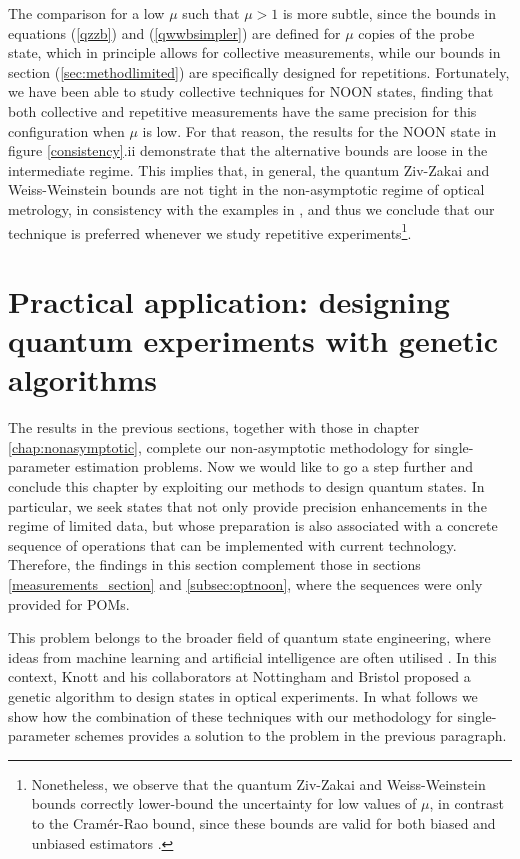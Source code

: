 The comparison for a low $\mu$ such that $\mu > 1$ is more subtle, since the bounds in equations (\ref{qzzb}) and (\ref{qwwbsimpler}) are defined for $\mu$ copies of the probe state, which in principle allows for collective measurements, while our bounds in section (\ref{sec:methodlimited}) are specifically designed for repetitions. Fortunately, we have been able to study collective techniques for NOON states, finding that both collective and repetitive measurements have the same precision for this configuration when $\mu$ is low. For that reason, the results for the NOON state in figure \ref{consistency}.ii demonstrate that the alternative bounds are loose in the intermediate regime. This implies that, in general, the quantum Ziv-Zakai and Weiss-Weinstein bounds are not tight in the non-asymptotic regime of optical metrology, in consistency with the examples in \cite{tsang2016}, and thus we conclude that our technique is preferred whenever we study repetitive experiments\footnote{Nonetheless, we observe that the quantum Ziv-Zakai and Weiss-Weinstein bounds correctly lower-bound the uncertainty for low values of $\mu$, in contrast to the Cram\'{e}r-Rao bound, since these bounds are valid for both biased and unbiased estimators \cite{tsang2012, tsang2016,  bayesbounds2007}.}. 

\section{Practical application: designing quantum experiments with genetic algorithms}
\label{sec:genetic}

The results in the previous sections, together with those in chapter \ref{chap:nonasymptotic}, complete our non-asymptotic methodology for single-parameter estimation problems. Now we would like to go a step further and conclude this chapter by exploiting our methods to design quantum states. In particular, we seek states that not only provide precision enhancements in the regime of limited data, but whose preparation is also associated with a concrete sequence of operations that can be implemented with current technology. Therefore, the findings in this section complement those in sections \ref{measurements_section} and \ref{subsec:optnoon}, where the sequences were only provided for POMs.

This problem belongs to the broader field of quantum state engineering, where ideas from machine learning and artificial intelligence are often utilised \cite{knott2016, jesus2018dec, driscoll2019}. In this context, Knott and his collaborators at Nottingham and Bristol \cite{jesus2018dec} proposed a genetic algorithm to design states in optical experiments. In what follows we show how the combination of these techniques with our methodology for single-parameter schemes provides a solution to the problem in the previous paragraph.

